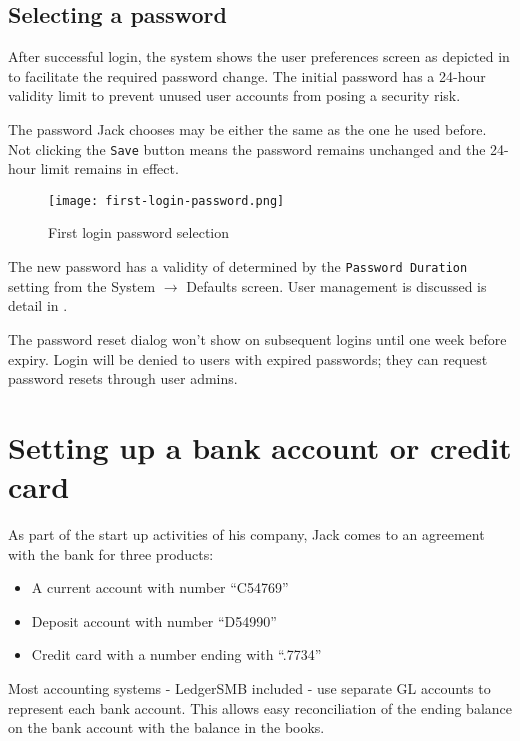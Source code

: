 \subsection{Selecting a password}

After successful login, the system shows the user preferences screen as depicted in
 to facilitate the required password change. The
initial password has a 24-hour validity limit to prevent unused user accounts from posing
a security risk.

The password Jack chooses may be either the same as the one he used before.
Not clicking the \texttt{Save} button means the password remains unchanged and the
24-hour limit remains in effect.

\begin{figure}[h]
\centering
\texttt{[image: first-login-password.png]}
\caption{First login password selection}
\label{fig:first-login-password}
\end{figure}

The new password has a validity of determined by the \texttt{Password Duration} setting
from the System $\rightarrow$ Defaults screen. User management is discussed is detail in .

The password reset dialog won't show on subsequent logins until one week
before expiry. Login will be denied to users with expired passwords; they can request
password resets through user admins.


\section{Setting up a bank account or credit card}
\label{sec:setup-bank-account}

As part of the start up activities of his company, Jack comes to an agreement with the
bank for three products:

\begin{itemize}
\item A current account with number ``C54769''
\item Deposit account with number ``D54990''
\item Credit card with a number ending with ``.7734''
\end{itemize}

Most accounting systems - LedgerSMB included - use separate GL accounts to represent
each bank account. This allows easy reconciliation of the ending balance on the bank
account with the balance in the books.

